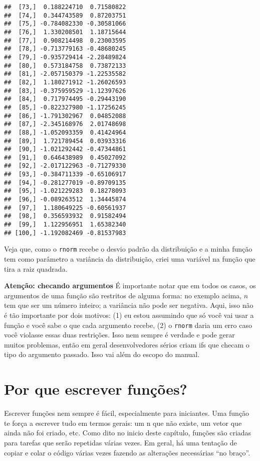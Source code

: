 \documentclass[]{book}
\begin{document}
\begin{verbatim}
##  [73,]  0.188224710  0.71580822
##  [74,]  0.344743589  0.87203751
##  [75,] -0.784082330 -0.30581066
##  [76,]  1.330208501  1.18715644
##  [77,]  0.908214498  0.23003595
##  [78,] -0.713779163 -0.48680245
##  [79,] -0.935729414 -2.28489824
##  [80,]  0.573184758  0.73872133
##  [81,] -2.057150379 -1.22535582
##  [82,]  1.180271912 -1.26026593
##  [83,] -0.375959529 -1.12397626
##  [84,]  0.717974495 -0.29443190
##  [85,] -0.822327980 -1.17256245
##  [86,] -1.791302967  0.04852088
##  [87,] -2.345168976  2.01748698
##  [88,] -1.052093359  0.41424964
##  [89,]  1.721789454  0.03933316
##  [90,] -1.021292442 -0.47344861
##  [91,]  0.646438989  0.45027092
##  [92,] -2.017122963 -0.71279330
##  [93,] -0.384711339 -0.65106917
##  [94,] -0.281277019 -0.89709135
##  [95,] -1.021229283  0.18278093
##  [96,] -0.089263512  1.34445874
##  [97,]  1.180649225 -0.60561937
##  [98,]  0.356593932  0.91582494
##  [99,]  1.122956951  1.65382340
## [100,] -1.192082469 -0.81537983
\end{verbatim}

Veja que, como o \texttt{rnorm} recebe o desvio padrão da distribuição e
a minha função tem como parâmetro a variância da distribuição, criei uma
variável na função que tira a raiz quadrada.

\textbf{Atenção: checando argumentos} É importante notar que em todos os
casos, os argumentos de uma função são restritos de alguma forma: no
exemplo acima, \(n\) tem que ser um número inteiro; a variância não pode
ser negativa. Aqui, isso não é tão importante por dois motivos: (1) eu
estou assumindo que só você vai usar a função e você sabe o que cada
argumento recebe, (2) o \texttt{rnorm} daria um erro caso você violasse
essas duas restrições. Isso nem sempre é verdade e pode gerar muitos
problemas, então em geral desenvolvedores sérios criam ifs que checam o
tipo do argumento passado. Isso vai além do escopo do manual.

\section{Por que escrever funções?}\label{por-que-escrever-funcoes}

Escrever funções nem sempre é fácil, especialmente para iniciantes. Uma
função te força a escrever tudo em termos gerais: um n que não existe,
um vetor que ainda não foi criado, etc. Como dito no inicio deste
capítulo, funções são criadas para tarefas que serão repetidas várias
vezes. Em geral, há uma tentação de copiar e colar o código várias vezes
fazendo as alterações necessárias ``no braço''.
\end{document}

